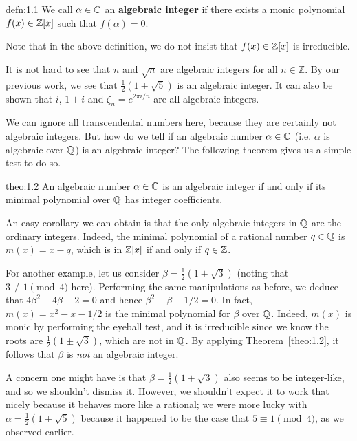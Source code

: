 \begin{defn}{defn:1.1}
    We call $\alpha \in \mathbb{C}$ an {\bf algebraic integer} if there 
    exists a monic polynomial $f(x) \in \mathbb{Z}[x]$ such that $f(\alpha) = 0$. 
\end{defn}\vspace{-0.25cm}

Note that in the above definition, we do not insist that $f(x) \in \mathbb{Z}[x]$ 
is irreducible.

It is not hard to see that $n$ and $\sqrt{n}$ are algebraic integers for 
all $n \in \mathbb{Z}$. By our previous work, we see that $\frac12(1 + \sqrt{5})$ 
is an algebraic integer. It can also be shown that $i$, $1 + i$ and 
$\zeta_n = e^{2\pi i/n}$ are all algebraic integers.

We can ignore all transcendental numbers here, because they are certainly 
not algebraic integers. But how do we tell if an algebraic number $\alpha \in \mathbb{C}$ 
(i.e. $\alpha$ is algebraic over $\mathbb{Q}$) is an algebraic integer? The following 
theorem gives us a simple test to do so.

\begin{theo}{theo:1.2}
    An algebraic number $\alpha \in \mathbb{C}$ is an algebraic integer if and only if 
    its minimal polynomial over $\mathbb{Q}$ has integer coefficients.
\end{theo}\vspace{-0.25cm}

An easy corollary we can obtain is that the only algebraic integers 
in $\mathbb{Q}$ are the ordinary integers. Indeed, the minimal polynomial of 
a rational number $q \in \mathbb{Q}$ is $m(x) = x - q$, which is in $\mathbb{Z}[x]$ 
if and only if $q \in \mathbb{Z}$. 

For another example, let us consider $\beta = \frac12(1 + \sqrt{3})$ (noting that 
$3 \not\equiv 1 \pmod 4$ here). Performing the same manipulations as before, 
we deduce that $4\beta^2 - 4\beta - 2 = 0$ and hence $\beta^2 - \beta - 1/2 = 0$. 
In fact, $m(x) = x^2 - x - 1/2$ is the minimal polynomial for $\beta$ over 
$\mathbb{Q}$. Indeed, $m(x)$ is monic by performing the eyeball test, and it is 
irreducible since we know the roots are $\frac12(1 \pm \sqrt{3})$, which are 
not in $\mathbb{Q}$. By applying Theorem~\ref{theo:1.2}, it follows that $\beta$ is 
\emph{not} an algebraic integer. 

A concern one might have is that $\beta = \frac12(1 + \sqrt{3})$ also seems to be 
integer-like, and so we shouldn't dismiss it. However, we shouldn't expect 
it to work that nicely because it behaves more like a rational; we were 
more lucky with $\alpha = \frac12(1 + \sqrt{5})$ because it happened to be the 
case that $5 \equiv 1 \pmod 4$, as we observed earlier.

